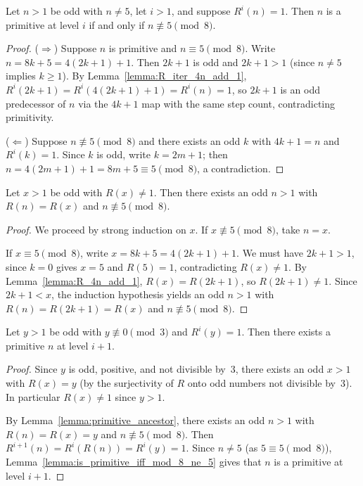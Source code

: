 \begin{lemma}\label{lemma:is_primitive_iff_mod_8_ne_5}\leanok
Let $n > 1$ be odd with $n \neq 5$, let $i > 1$, and suppose $R^i(n) = 1$.
Then $n$ is a primitive at level $i$ if and only if $n \not\equiv 5 \pmod{8}$.
\end{lemma}
\begin{proof}\leanok
($\Rightarrow$) Suppose $n$ is primitive and $n \equiv 5 \pmod{8}$.
Write $n = 8k + 5 = 4(2k+1) + 1$. Then $2k+1$ is odd and $2k + 1 > 1$ (since $n \neq 5$ implies $k \geq 1$).
By Lemma~\ref{lemma:R_iter_4n_add_1}, $R^i(2k+1) = R^i(4(2k+1)+1) = R^i(n) = 1$,
so $2k+1$ is an odd predecessor of $n$ via the $4k+1$ map with the same step count, contradicting primitivity.

($\Leftarrow$) Suppose $n \not\equiv 5 \pmod{8}$ and there exists an odd $k$ with $4k + 1 = n$ and $R^i(k) = 1$.
Since $k$ is odd, write $k = 2m + 1$; then $n = 4(2m+1) + 1 = 8m + 5 \equiv 5 \pmod{8}$, a contradiction.
\end{proof}

\begin{lemma}\label{lemma:primitive_ancestor}\leanok
Let $x > 1$ be odd with $R(x) \neq 1$. Then there exists an odd $n > 1$ with $R(n) = R(x)$ and $n \not\equiv 5 \pmod{8}$.
\end{lemma}
\begin{proof}\leanok
We proceed by strong induction on $x$.
If $x \not\equiv 5 \pmod{8}$, take $n = x$.

If $x \equiv 5 \pmod{8}$, write $x = 8k + 5 = 4(2k+1) + 1$.
We must have $2k + 1 > 1$, since $k = 0$ gives $x = 5$ and $R(5) = 1$, contradicting $R(x) \neq 1$.
By Lemma~\ref{lemma:R_4n_add_1}, $R(x) = R(2k+1)$, so $R(2k+1) \neq 1$.
Since $2k + 1 < x$, the induction hypothesis yields an odd $n > 1$ with $R(n) = R(2k+1) = R(x)$ and $n \not\equiv 5 \pmod{8}$.
\end{proof}

\begin{lemma}\label{lemma:odd_node_generates_primitive}\leanok
Let $y > 1$ be odd with $y \not\equiv 0 \pmod{3}$ and $R^i(y) = 1$. Then there exists a primitive $n$ at level $i + 1$.
\end{lemma}
\begin{proof}\leanok
Since $y$ is odd, positive, and not divisible by~3, there exists an odd $x > 1$ with $R(x) = y$ (by the surjectivity of $R$ onto odd numbers not divisible by~3).
In particular $R(x) \neq 1$ since $y > 1$.

By Lemma~\ref{lemma:primitive_ancestor}, there exists an odd $n > 1$ with $R(n) = R(x) = y$ and $n \not\equiv 5 \pmod{8}$.
Then $R^{i+1}(n) = R^i(R(n)) = R^i(y) = 1$.
Since $n \neq 5$ (as $5 \equiv 5 \pmod{8}$), Lemma~\ref{lemma:is_primitive_iff_mod_8_ne_5} gives that $n$ is a primitive at level $i + 1$.
\end{proof}

